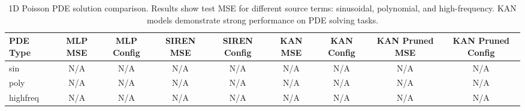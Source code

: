 \begin{table}
\caption{1D Poisson PDE solution comparison. Results show test MSE for different source terms: sinusoidal, polynomial, and high-frequency. KAN models demonstrate strong performance on PDE solving tasks.}
\label{tab:pde_1d_comparison}
\begin{tabular}{|l|c|c|c|c|c|c|c|c|}
\toprule
PDE Type & MLP MSE & MLP Config & SIREN MSE & SIREN Config & KAN MSE & KAN Config & KAN Pruned MSE & KAN Pruned Config \\
\midrule
sin & N/A & N/A & N/A & N/A & N/A & N/A & N/A & N/A \\
poly & N/A & N/A & N/A & N/A & N/A & N/A & N/A & N/A \\
highfreq & N/A & N/A & N/A & N/A & N/A & N/A & N/A & N/A \\
\bottomrule
\end{tabular}
\end{table}
